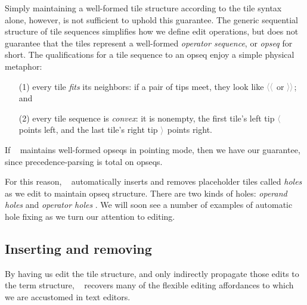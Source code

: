 Simply maintaining a well-formed tile structure
according to the tile syntax alone, however, is
not sufficient to uphold this guarantee.
The generic sequential structure of tile sequences
simplifies how we define edit operations, but
does not guarantee that the tiles represent a well-formed
\emph{operator sequence}, or \emph{opseq} for short.
The qualifications for a tile sequence to an opseq
enjoy a simple physical metaphor:
\begin{enumerate}
\item[(1)] every tile \emph{fits} its neighbors:
  if a pair of tips meet, they look like $\ltiletip\ltiletip$
  or $\rtiletip\rtiletip$; and
\item[(2)] every tile sequence is \emph{convex}:
  it is nonempty, the first tile's left tip $\ltiletip$
  points left, and the last tile's right tip $\rtiletip$
  points right.
\end{enumerate}
If \tylr~ maintains well-formed opseqs in pointing mode, then we have
our guarantee, since precedence-parsing is total on opseqs.

For this reason, \tylr~ automatically inserts
and removes placeholder tiles called \emph{holes}
as we edit to maintain opseq structure.
There are two kinds of holes:
\emph{operand holes} \optile{\ophole}
and \emph{operator holes} \bintile{\binhole}.
We will soon see a number of examples of
automatic hole fixing as we turn our attention
to editing.




\subsection{Inserting and removing}
By having us edit the tile structure, and only
indirectly propagate those edits to the term structure,
\tylr~ recovers many of the flexible editing affordances to
which we are accustomed in text editors.

